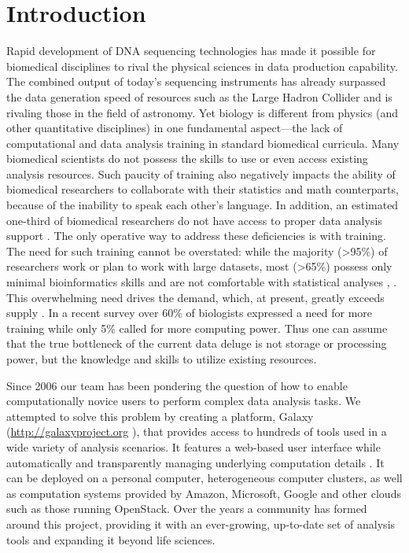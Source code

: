 \section*{Introduction}
Rapid development of DNA sequencing technologies has made it possible for biomedical disciplines to rival the physical sciences in data production capability. The combined output of today’s sequencing instruments has already surpassed the data generation speed of resources such as the Large Hadron Collider and is rivaling those in the field of astronomy. Yet biology is different from physics (and other quantitative disciplines) in one fundamental aspect—the lack of computational and data analysis training in standard biomedical curricula. Many biomedical scientists do not possess the skills to use or even access existing analysis resources.
Such paucity of training also negatively impacts the ability of biomedical researchers to collaborate with their statistics and math counterparts, because of the inability to speak each other’s language. In addition, an estimated one-third of biomedical researchers do not have access to proper data analysis support \cite{larcombe2017elixir}. The only operative way to address these deficiencies is with training. The need for such training cannot be overstated: while the majority (>95\%) of researchers work or plan to work with large datasets, most (>65\%) possess only minimal bioinformatics skills and are not comfortable with statistical analyses \cite{larcombe2017elixir}, \cite{williams2017vision}.
This overwhelming need drives the demand, which, at present, greatly exceeds supply \cite{attwood2017global}. In a recent survey \cite{survey2013embl} over 60\% of biologists expressed a need for more training while only 5\% called for more computing power. Thus one can assume that the true bottleneck of the current data deluge is not storage or processing power, but the knowledge and skills to utilize existing resources.

Since 2006 our team has been pondering the question of how to enable computationally novice users to perform complex data analysis tasks. We attempted to solve this problem by creating a platform, Galaxy (\url{http://galaxyproject.org} \cite{afgan2016galaxy}), that provides access to hundreds of tools used in a wide variety of analysis scenarios. It features a web-based user interface while automatically and transparently managing underlying computation details \cite{afgan2016galaxy}. It can be deployed on a personal computer, heterogeneous computer clusters, as well as computation systems provided by Amazon, Microsoft, Google and other clouds such as those running OpenStack. Over the years a community has formed around this project, providing it with an ever-growing, up-to-date set of analysis tools and expanding it beyond life sciences.


